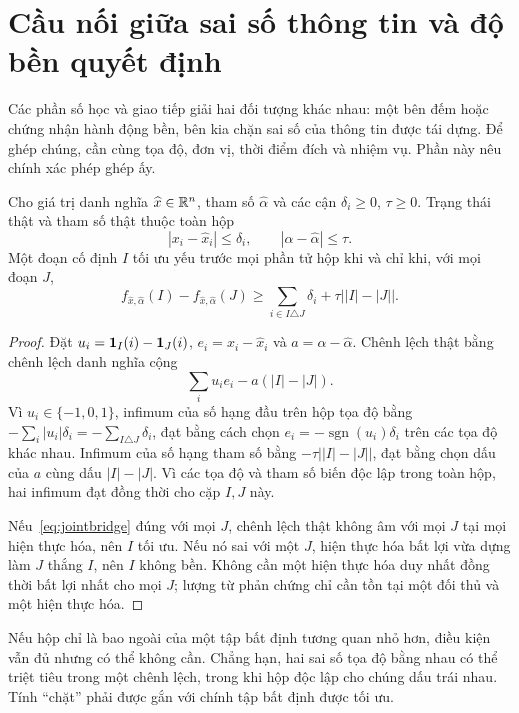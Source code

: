 \section{Cầu nối giữa sai số thông tin và độ bền quyết định}\label{sec:bridge}
Các phần số học và giao tiếp giải hai đối tượng khác nhau: một bên đếm hoặc chứng nhận hành động bền, bên kia chặn sai số của thông tin được tái dựng. Để ghép chúng, cần cùng tọa độ, đơn vị, thời điểm đích và nhiệm vụ. Phần này nêu chính xác phép ghép ấy.

\begin{theorem}\label{thm:heterogeneous}
Cho giá trị danh nghĩa $\widehat x\in\mathbb R^n$, tham số $\widehat\alpha$ và các cận $\delta_i\ge0$, $\tau\ge0$. Trạng thái thật và tham số thật thuộc toàn hộp
\[
|x_i-\widehat x_i|\le\delta_i,\qquad
|\alpha-\widehat\alpha|\le\tau.
\]
Một đoạn cố định $I$ tối ưu yếu trước mọi phần tử hộp khi và chỉ khi, với mọi đoạn $J$,
\begin{equation}\label{eq:jointbridge}
f_{\widehat x,\widehat\alpha}(I)-f_{\widehat x,\widehat\alpha}(J)
\ge \sum_{i\in I\triangle J}\delta_i+\tau\big||I|-|J|\big|.
\end{equation}
\end{theorem}
\begin{proof}
Đặt $u_i=\mathbf 1_I(i)-\mathbf 1_J(i)$, $e_i=x_i-\widehat x_i$ và $a=\alpha-\widehat\alpha$. Chênh lệch thật bằng chênh lệch danh nghĩa cộng
\[
\sum_i u_ie_i-a(|I|-|J|).
\]
Vì $u_i\in\{-1,0,1\}$, infimum của số hạng đầu trên hộp tọa độ bằng $-\sum_i|u_i|\delta_i=-\sum_{I\triangle J}\delta_i$, đạt bằng cách chọn $e_i=-\operatorname{sgn}(u_i)\delta_i$ trên các tọa độ khác nhau. Infimum của số hạng tham số bằng $-\tau\big||I|-|J|\big|$, đạt bằng chọn dấu của $a$ cùng dấu $|I|-|J|$. Vì các tọa độ và tham số biến độc lập trong toàn hộp, hai infimum đạt đồng thời cho cặp $I,J$ này.

Nếu~\eqref{eq:jointbridge} đúng với mọi $J$, chênh lệch thật không âm với mọi $J$ tại mọi hiện thực hóa, nên $I$ tối ưu. Nếu nó sai với một $J$, hiện thực hóa bất lợi vừa dựng làm $J$ thắng $I$, nên $I$ không bền. Không cần một hiện thực hóa duy nhất đồng thời bất lợi nhất cho mọi $J$; lượng từ phản chứng chỉ cần tồn tại một đối thủ và một hiện thực hóa.
\end{proof}
Nếu hộp chỉ là bao ngoài của một tập bất định tương quan nhỏ hơn, điều kiện vẫn đủ nhưng có thể không cần. Chẳng hạn, hai sai số tọa độ bằng nhau có thể triệt tiêu trong một chênh lệch, trong khi hộp độc lập cho chúng dấu trái nhau. Tính ``chặt'' phải được gắn với chính tập bất định được tối ưu.

